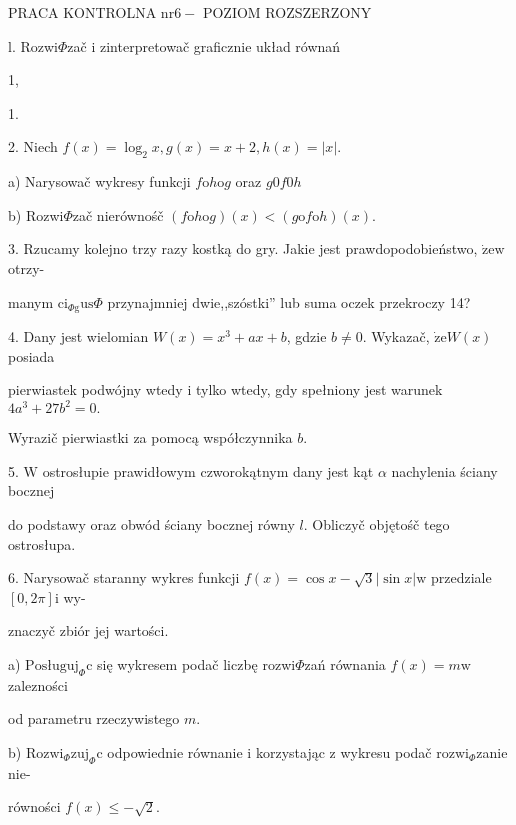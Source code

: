 \documentclass[a4paper,12pt]{article}
\begin{document}
PRACA KONTROLNA $\mathrm{n}\mathrm{r} 6-$ POZIOM ROZSZERZONY

l. Rozwi$\Phi$zač $\mathrm{i}$ zinterpretowač graficznie układ równań 

1,

1.

2. Niech $f(x)=\log_{2}x, g(x)=x+2, h(x)=|x|.$

a) Narysowač wykresy funkcji $f\mathrm{o}h\mathrm{o}g$ oraz $g0f0h$

b) Rozwi$\Phi$zač nierównośč $(f\mathrm{o}h\mathrm{o}g)(x)<(g\mathrm{o}f\mathrm{o}h)(x).$

3. Rzucamy kolejno trzy razy kostką do gry. Jakie jest prawdopodobieństwo, $\dot{\mathrm{z}}\mathrm{e}\mathrm{w}$ otrzy-

manym $\mathrm{c}\mathrm{i}_{\Phi \mathrm{g}}\mathrm{u}\mathrm{s}\Phi$ przynajmniej dwie,,szóstki'' lub suma oczek przekroczy 14?

4. Dany jest wielomian $W(x) = x^{3}+ax+b$, gdzie $b \neq 0$. Wykazač, $\dot{\mathrm{z}}\mathrm{e} W(x)$ posiada

pierwiastek podwójny wtedy $\mathrm{i}$ tylko wtedy, gdy spełniony jest warunek $4a^{3}+27b^{2}=0.$

Wyrazič pierwiastki za pomocą współczynnika $b.$

5. $\mathrm{W}$ ostrosłupie prawidłowym czworokątnym dany jest kąt $\alpha$ nachylenia ściany bocznej

do podstawy oraz obwód ściany bocznej równy $l$. Obliczyč objętośč tego ostrosłupa.

6. Narysowač staranny wykres funkcji $f(x)=\cos x-\sqrt{3}|\sin x| \mathrm{w}$ przedziale $[0,2\pi] \mathrm{i}$ wy-

znaczyč zbiór jej wartości.

a) $\mathrm{P}\mathrm{o}\mathrm{s}\text{ł} \mathrm{u}\mathrm{g}\mathrm{u}\mathrm{j}_{\Phi}\mathrm{c}$ się wykresem podač liczbę rozwi$\Phi$zań równania $f(x)=m\mathrm{w}$ zalezności

od parametru rzeczywistego $m.$

b) $\mathrm{R}\mathrm{o}\mathrm{z}\mathrm{w}\mathrm{i}_{\Phi}\mathrm{z}\mathrm{u}\mathrm{j}_{\Phi}\mathrm{c}$ odpowiednie równanie $\mathrm{i}$ korzystając $\mathrm{z}$ wykresu podač $\mathrm{r}\mathrm{o}\mathrm{z}\mathrm{w}\mathrm{i}_{\Phi}$zanie nie-

równości $f(x)\leq-\sqrt{2}.$
\end{document}
